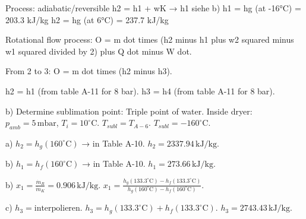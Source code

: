 Process: adiabatic/reversible  
h2 = h1 + wK → h1 siehe b)  
h1 = hg (at -16°C) = 203.3 kJ/kg  
h2 = hg (at 6°C) = 237.7 kJ/kg

Rotational flow process:  
O = m dot times (h2 minus h1 plus w2 squared minus w1 squared divided by 2) plus Q dot minus W dot.  

From 2 to 3:  
O = m dot times (h2 minus h3).  

h2 = h1 (from table A-11 for 8 bar).  
h3 = h4 (from table A-11 for 8 bar).

b) Determine sublimation point: Triple point of water.  
Inside dryer: \( p_{amb} = 5 \, \text{mbar} \), \( T_i = 10^\circ \text{C} \).  
\( T_{subl} = T_{A-6} \).  
\( T_{subl} = -160^\circ \text{C} \).  

a) \( h_2 = h_g(160^\circ \text{C}) \) → in Table A-10.  
\( h_2 = 2337.94 \, \text{kJ/kg} \).  

b) \( h_1 = h_f(160^\circ \text{C}) \) → in Table A-10.  
\( h_1 = 273.66 \, \text{kJ/kg} \).  

b) \( x_1 = \frac{\dot{m}_R}{\dot{m}_K} = 0.906 \, \text{kJ/kg} \).  
\( x_1 = \frac{h_g(133.3^\circ \text{C}) - h_f(133.3^\circ \text{C})}{h_g(160^\circ \text{C}) - h_f(160^\circ \text{C})} \).  

c) \( h_3 = \text{interpolieren} \).  
\( h_3 = h_g(133.3^\circ \text{C}) + h_f(133.3^\circ \text{C}) \).  
\( h_3 = 2743.43 \, \text{kJ/kg} \).